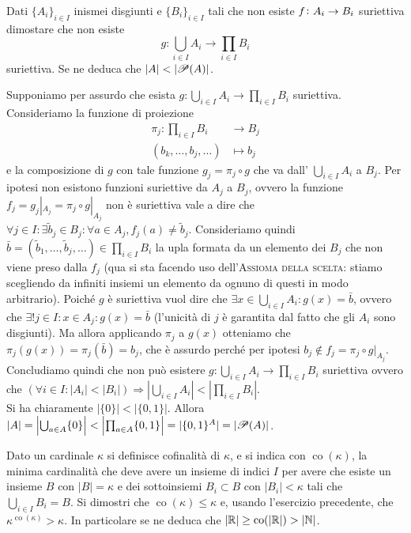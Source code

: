 \begin{es}
  Dati $ \{A_i\}_{i \in I} $ inismei disgiunti e $ \{B_i\}_{i \in I} $ tali che non esiste $ f \colon A_i \to \nolinebreak B_i $ suriettiva dimostare che non esiste \[g \colon \bigcup_{i \in I} A_i \to \prod_{i \in I} B_i\] suriettiva. Se ne deduca che $ |A| < |\P(A)| $.
\end{es}
Supponiamo per assurdo che esista $ g \colon \bigcup_{i \in I} A_i \to \prod_{i \in I} B_i $ suriettiva. Consideriamo la funzione di proiezione
\begin{align*}
  \pi_j \colon \prod_{i \in I}B_i & \to B_j \\
  (b_k, \dots, b_j, \dots) & \mapsto b_j
\end{align*}
e la composizione di $ g $ con tale funzione $ g_j = \pi_j \circ g $ che va dall' $ \bigcup_{i \in I} A_i $ a $ B_j $. Per ipotesi non esistono funzioni suriettive da $ A_j $ a $ B_j $, ovvero la funzione $ f_j = g_j |_{A_j} = \pi_j \circ g|_{A_j} $ non è suriettiva vale a dire che $ \forall j \in I: \exists \tilde{b}_j \in B_j : \forall a \in A_j, f_j(a) \neq \tilde{b}_j $. Consideriamo quindi $ \bar{b} = (\tilde{b}_1, \dots, \tilde{b}_j, \dots) \in \prod_{i \in I}B_i $ la upla formata da un elemento dei $ B_j $ che non viene preso dalla $ f_j $ (qua si sta facendo uso dell'\textsc{Assioma della scelta}: stiamo scegliendo da infiniti insiemi un elemento da ognuno di questi in modo arbitrario). Poiché $ g $ è suriettiva vuol dire che $ \exists x \in \bigcup_{i \in I} A_i : g(x) = \bar{b} $, ovvero che $ \exists! j \in I : x \in A_j : g(x) = \bar{b} $ (l'unicità di $ j $ è garantita dal fatto che gli $ A_i $ sono disgiunti). Ma allora applicando $ \pi_j $ a $ g(x) $ otteniamo che $ \pi_j(g(x)) = \pi_j(\bar{b}) = b_j $, che è assurdo perché per ipotesi $ b_j \notin f_j = \pi_j \circ g |_{A_j} $. Concludiamo quindi che non può esistere $ g \colon \bigcup_{i \in I} A_i \to \prod_{i \in I} B_i $ suriettiva ovvero che $ (\forall i \in I : |A_i| < |B_i|) \Rightarrow \left|\bigcup_{i \in I} A_i\right| < \left|\prod_{i \in I} B_i\right| $. \\
Si ha chiaramente $ |\{0\}| < |\{0, 1\}| $. Allora $ |A| = \left|\bigcup_{a \in A} \{0\}\right| < \left|\prod_{a \in A} \{0, 1\}\right| = |\{0, 1\}^A| = |\P(A)| $.

\begin{es}[facoltativo]
  Dato un cardinale $ \kappa $ si definisce cofinalità di $ \kappa $, e si indica con $ \operatorname{co}(\kappa) $, la minima cardinalità che deve avere un insieme di indici $ I $ per avere che esiste un insieme $ B $ con $ |B| = \kappa $ e dei sottoinsiemi $ B_i \subset B $ con $ |B_i| < \kappa $ tali che $ \bigcup_{i \in I} B_i = B $. Si dimostri che $ \operatorname{co}(\kappa) \leq \kappa $ e, usando l'esercizio precedente, che $ \kappa^{\operatorname{co}(\kappa)} > \kappa $. In particolare se ne deduca che $ |\R| \geq \operatorname{co}(|\R|) > |\N| $.
\end{es}

